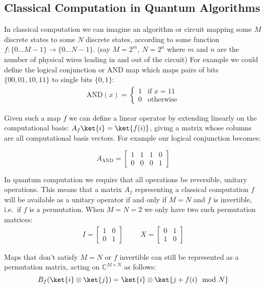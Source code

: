 \subsection{Classical Computation in Quantum Algorithms}
In classical computation we can imagine an algorithm or circuit mapping some $M$ discrete states to some $N$ discrete states, according to some function $f: \{0\dots M-1\} \to \{0\dots N-1\}$. (say $M = 2^m,\ N = 2^n$ where $m$ and $n$ are the number of physical wires leading in and out of the circuit) For example we could define the logical conjunction or AND map which maps pairs of bits $\{00, 01, 10, 11\}$ to single bits $\{0, 1\}$: 
\begin{align*}
	\text{AND}(x) = \begin{cases}
		1 & \text{if\ } x = 11\\
		0 & \text{otherwise}
	\end{cases}
\end{align*}

Given such a map $f$ we can define a linear operator by extending linearly on the computational basis: $A_f\ket{i} = \ket{f(i)}$, giving a matrix whose columns are all computational basis vectors. For example our logical conjunction becomes:

\[
A_\text{AND} = \left[\begin{matrix}
	1&1&1&0\\
	0&0&0&1
\end{matrix}\right]
\]

In quantum computation we require that all operations be reversible, unitary operations. This means that a matrix $A_f$ representing a classical computation $f$ will be available as a unitary operator if and only if $M=N$ and $f$ is invertible, i.e.\ if $f$ is a permutation. When $M = N = 2$ we only have two such permutation matrices:
\begin{align*}
	I = \left[\begin{matrix}
		1&0\\
		0&1
	\end{matrix}\right]
	&&&
	X = \left[\begin{matrix}
		0&1\\
		1&0
	\end{matrix}\right]
\end{align*}

Maps that don't satisfy $M = N$ or $f$ invertible can still be represented as a permutation matrix, acting on $\mathbb{C}^{M\times N}$ as follows:
\[B_f(\ket{i}\otimes\ket{j}) = \ket{i}\otimes\ket{j+f(i) \mod N}\]

